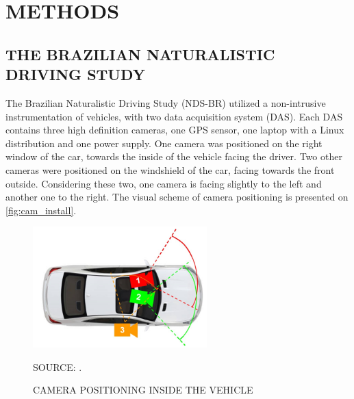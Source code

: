 
\chapter{METHODS}

\section{THE BRAZILIAN NATURALISTIC DRIVING STUDY} \label{ndsc}




The Brazilian Naturalistic Driving Study (NDS-BR) utilized a non-intrusive instrumentation of vehicles, with two data acquisition system (DAS). Each DAS contains three high definition cameras, one GPS sensor, one laptop with a Linux distribution and one power supply. One camera was positioned on the right window of the car, towards the inside of the vehicle facing the driver. Two other cameras were positioned on the windshield of the car, facing towards the front outside. Considering these two, one camera is facing slightly to the left and another one to the right. The visual scheme of camera positioning is presented on \autoref{fig:cam_install}.

\begin{figure}[!htbp]
    \centering\footnotesize
    \captionsetup{font=footnotesize}
    \caption{CAMERA POSITIONING INSIDE THE VEHICLE}
    \includegraphics[width=0.6\textwidth]{fig/cam_install.png}
    \label{fig:cam_install}
    \par SOURCE: \textcite{Amancio2021}.
\end{figure}

